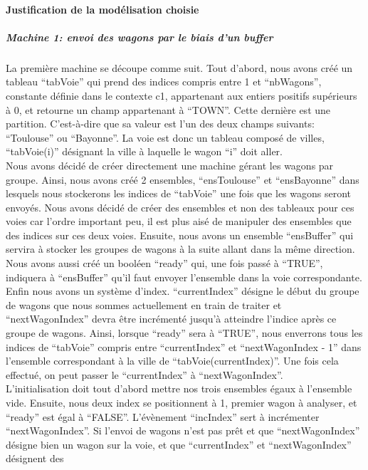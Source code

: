 \paragraph{Justification de la modélisation choisie}

\subparagraph{Machine 1: envoi des wagons par le biais d'un buffer}

La première machine se découpe comme suit. Tout d'abord, nous avons créé un
tableau ``tabVoie'' qui prend des indices compris entre 1 et ``nbWagons'',
constante définie dans le contexte c1, appartenant aux entiers positifs
supérieurs à 0, et retourne un champ appartenant à ``TOWN''. Cette dernière
est une partition. C'est-à-dire que sa valeur est l'un des deux champs
suivants: ``Toulouse'' ou ``Bayonne''. La voie est donc un tableau composé
de villes, ``tabVoie(i)'' désignant la ville à laquelle le wagon ``i''
doit aller.
\\
Nous avons décidé de créer directement une machine gérant les wagons par
groupe. Ainsi, nous avons créé 2 ensembles, ``ensToulouse'' et ``ensBayonne''
dans lesquels nous stockerons les indices de ``tabVoie'' une fois que les wagons
seront envoyés. Nous avons décidé de créer des ensembles et non des tableaux
pour ces voies car l'ordre important peu, il est plus aisé de manipuler
des ensembles que des indices sur ces deux voies. Ensuite, nous avons un ensemble
``ensBuffer'' qui servira à stocker les groupes de wagons à la suite allant dans
la même direction. Nous avons aussi créé un booléen ``ready'' qui, une fois passé
à ``TRUE'', indiquera à ``ensBuffer'' qu'il faut envoyer l'ensemble dans la voie
correspondante. Enfin nous avons un système d'index. ``currentIndex'' désigne
le début du groupe de wagons que nous sommes actuellement en train de traiter
et ``nextWagonIndex'' devra être incrémenté jusqu'à atteindre l'indice après ce
groupe de wagons. Ainsi, lorsque ``ready'' sera à ``TRUE'', nous enverrons tous
les indices de ``tabVoie'' compris entre ``currentIndex'' et ``nextWagonIndex - 1''
dans l'ensemble correspondant à la ville de ``tabVoie(currentIndex)''. Une fois cela
effectué, on peut passer le ``currentIndex'' à ``nextWagonIndex''.
\\
L'initialisation doit tout d'abord mettre nos trois ensembles égaux à l'ensemble vide.
Ensuite, nous deux index se positionnent à 1, premier wagon à analyser, et ``ready''
est égal à ``FALSE''. L'évènement ``incIndex'' sert à incrémenter ``nextWagonIndex''.
Si l'envoi de wagons n'est pas prêt et que ``nextWagonIndex'' désigne bien un wagon
sur la voie, et que ``currentIndex'' et ``nextWagonIndex'' désignent des

